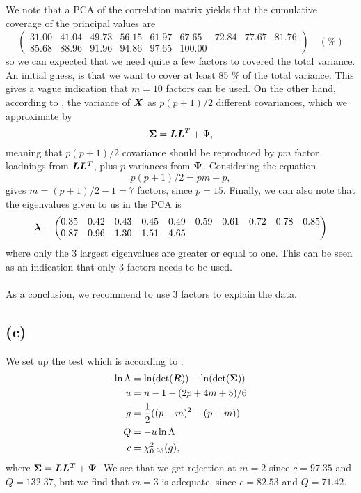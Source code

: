 We note that a PCA of the correlation matrix yields that the cumulative
coverage of the principal values are 
\begin{equation*}
  \begin{pmatrix}
    31.00 &41.04 &49.73 &56.15 &61.97 &67.65 &72.84 &77.67 &81.76\\
    85.68 &88.96 &91.96 &94.86 &97.65 &100.00 
  \end{pmatrix}\quad (\%)
\end{equation*}
so we can expected that we need quite a few factors to covered the total
variance.  An initial guess, is that we want to cover at least 85 \% of
the total variance. This gives a vague indication that $m = 10$
factors can be used. On the other hand, according to
\cite[p. 485]{book}, the variance of $\bm{X}$ as $p(p+1)/2$ different
covariances, which we approximate by
\begin{equation*}
  \bm{\Sigma} = \bm{L} \bm{L}^{T} + \Psi,
\end{equation*}
meaning that $p(p+1)/2$ covariance should be reproduced by $pm$ factor
loadnings from $\bm{L} \bm{L}^{T}$, plus $p$ variances from $\bm{\Psi}$. Considering the equation 
\begin{equation*}
  p(p + 1)/2 = pm + p,
\end{equation*}
gives $m =(p + 1)/2 - 1 = 7 $ factors, since $p = 15$. Finally, we can
also note that the eigenvalues given to us in the PCA is
\begin{equation*}
  \bm{\lambda} =
  \begin{pmatrix}
    0.35 &0.42 &0.43 &0.45 &0.49 &0.59 &0.61 &0.72 &0.78 &0.85 \\ 0.87 &0.96 &1.30 &1.51 &4.65 
  \end{pmatrix}
\end{equation*}
where only the 3 largest eigenvalues are greater or equal to one. This
can be seen as an indication that only 3 factors needs to be used. \\
\\
As a conclusion, we recommend to use 3 factors to explain the data.
\subsection*{(c)}
\label{sec:c-8}
 We set up the test which is
according to \cite[p. 502]{book}:
\begin{align*}
  \ln \Lambda &= \ln(\det(\bm{R})) - \ln(\det(\bm{\Sigma})) \\
  u &=  n - 1 -(2p+4m+5)/6 \\
  g &= \frac 12 ((p-m)^2 - (p+m)) \\
  Q &= -u \ln \Lambda \\
  c &=  \chi^2_{0.95}(g),
\end{align*}
where $\bm{\Sigma} = \bm{LL^T} + \bm{\Psi}$. We see that we get rejection at
$m = 2$ since $c = 97.35$ and $Q = 132.37$, but we find that $m = 3$
is adequate, since $c = 82.53$ and $Q = 71.42$. 
